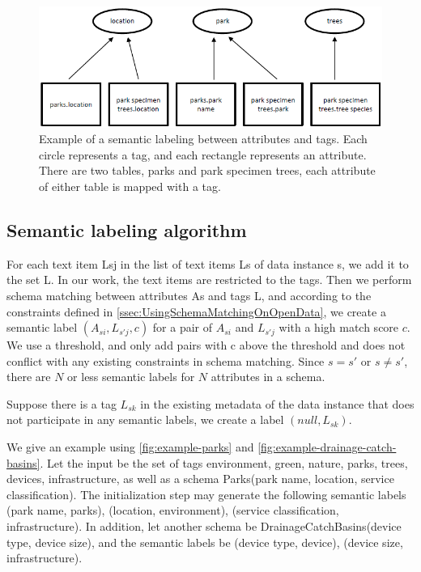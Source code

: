 \begin{figure}
    \centering
    \includegraphics[width=5in]{figures/example-semantic-labeling.png}
    \caption{Example of a semantic labeling between attributes and tags.
    Each circle represents a tag, and each rectangle represents an attribute. There are two tables, parks and park specimen trees, each attribute of either table is mapped with a tag.}
    \label{fig:example-semantic-labeling}
\end{figure}

\subsection{Semantic labeling algorithm}
\label{ssec:SemanticLabelingAlgorithm}

For each text item Lsj in the list of text items Ls of data instance s, we add it to the set L. In our work, the text items are restricted to the tags. Then we perform schema matching between attributes As and tags L, and according to the constraints defined in \autoref{ssec:UsingSchemaMatchingOnOpenData}, we create a semantic label $(A_{si},L_{s'j},c)$ for a pair of $A_{si}$ and $L_{s'j}$ with a high match score $c$. We use a threshold, and only add pairs with c above the threshold and does not conflict with any existing constraints in schema matching. Since $s=s'$ or $s\neq s'$, there are $N$ or less semantic labels for $N$ attributes in a schema.

Suppose there is a tag $L_{sk}$ in the existing metadata of the data instance that does not participate in any semantic labels, we create a label $(null,L_{sk})$.

We give an example using \autoref{fig:example-parks} and \autoref{fig:example-drainage-catch-basins}. Let the input be the set of tags {environment, green, nature, parks, trees, devices, infrastructure}, as well as a schema Parks(park name, location, service classification). The initialization step may generate the following semantic labels (park name, parks), (location, environment), (service classification, infrastructure). In addition, let another schema be DrainageCatchBasins(device type, device size), and the semantic labels be (device type, device), (device size, infrastructure).

